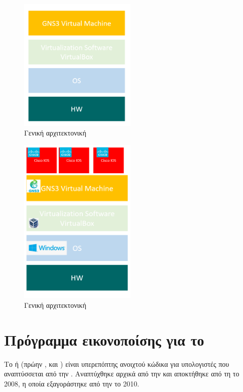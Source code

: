 \begin{figure}[htb]
	\centering
	\includegraphics[width=0.5\textwidth]{graphics/Architecture_virtualbox.PNG}
	\caption{ Γενική αρχιτεκτονική}
\end{figure}

\begin{figure}[htb]
	\centering
	\includegraphics[width=0.5\textwidth]{graphics/virtualization_architecture.PNG}
	\caption{ Γενική αρχιτεκτονική}
\end{figure}

\section{Πρόγραμμα εικονοποίσης για το }

Το  ή  (πρώην ,  και ) είναι υπερεπόπτης
ανοιχτού κώδικα για υπολογιστές  που αναπτύσσεται από την .
Αναπτύχθηκε αρχικά από την 
και αποκτήθηκε από τη  το 2008, η οποία εξαγοράστηκε από την  το 2010.

